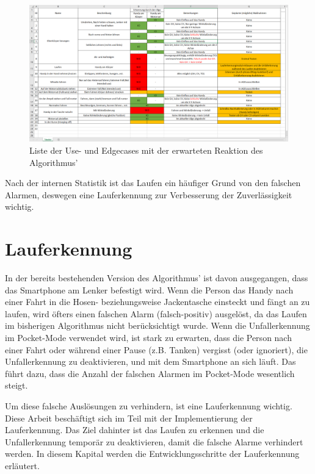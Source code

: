 \begin{figure}[H]
	\centering
	\includegraphics[width=\linewidth]{Bilder/EdgeCasesExcel.png}
	\caption{Liste der Use- und Edgecases mit der erwarteten Reaktion des Algorithmus'}
	\label{fig:EdgeCasesExcel}
\end{figure}

Nach der internen Statistik ist das Laufen ein häufiger Grund von den falschen Alarmen, deswegen eine Lauferkennung zur Verbesserung der Zuverlässigkeit wichtig.

\section{Lauferkennung} \label{sec:Lauferkennung}
In der bereits bestehenden Version des Algorithmus' ist davon ausgegangen, dass das Smartphone am Lenker befestigt wird. Wenn die Person das Handy nach einer Fahrt in die Hosen- beziehungsweise Jackentasche einsteckt und fängt an zu laufen, wird öfters einen falschen Alarm (falsch-positiv) ausgelöst, da das Laufen im bisherigen Algorithmus nicht berücksichtigt wurde.
Wenn die Unfallerkennung im Pocket-Mode verwendet wird, ist stark zu erwarten, dass die Person nach einer Fahrt oder während einer Pause (z.B. Tanken) vergisst (oder ignoriert), die Unfallerkennung zu deaktivieren, und mit dem Smartphone an sich läuft. Das führt dazu, dass die Anzahl der falschen Alarmen im Pocket-Mode wesentlich steigt.

Um diese falsche Auslösungen zu verhindern, ist eine Lauferkennung wichtig. Diese Arbeit beschäftigt sich im Teil mit der Implementierung der Lauferkennung. Das Ziel dahinter ist das Laufen zu erkennen und die Unfallerkennung temporär zu deaktivieren, damit die falsche Alarme verhindert werden.
In diesem Kapital werden die Entwicklungsschritte der Lauferkennung erläutert.

